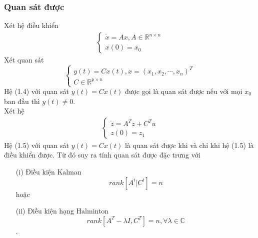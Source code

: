 \documentclass[12pt,a4paper]{report}
\begin{document}
\subsubsection{Quan sát được}
Xét hệ điều khiển \begin{eqnarray}
	\begin{cases}
		\dot{x} = Ax, A \in \mathbb{R}^{n\times n} \\ x(0) = x_0
	\end{cases}
\end{eqnarray} Xét quan sát $$\begin{cases}
y(t)=Cx(t), x = (x_1,x_2,\cdots,x_n)^T\\C \in\mathbb{R}^{p \times
	 n}
\end{cases}$$ Hệ (1.4) với quan sát $y(t) = Cx(t)$  được gọi là quan sát được nếu với mọi $x_0$ ban đầu thì $y(t) \neq 0.$ \\Xét hệ \begin{eqnarray}
\begin{cases}
	\dot{z} = A^Tz + C^Tu \\ z(0) = z_1
\end{cases}
\end{eqnarray} Hệ (1.5) với quan sát $y(t) = Cx(t)$ là quan sát được khi và chỉ khi hệ (1.5) là điều khiển được. Từ đó suy ra tính quan sát được đặc trưng với \begin{itemize}
\item[(i)] Điều kiện Kalman $$rank [A^i|C^i] = n$$ hoặc 
\item[(ii)] Điều kiện hạng Halminton $$rank [A^T-\lambda I, C^T] = n,  \forall \lambda \in \mathbb{C}$$.
\end{itemize}
\end{document}
